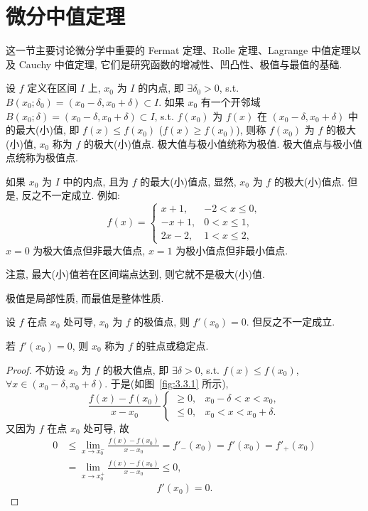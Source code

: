 \section{微分中值定理}\label{sec:3.3}

这一节主要讨论微分学中重要的 Fermat 定理、Rolle 定理、Lagrange 中值定理以及 Cauchy 中值定理, 它们是研究函数的增减性、凹凸性、极值与最值的基础.

\begin{definition}\label{def:3.3.1}
设 $f$ 定义在区间 $I$ 上, $x_0$ 为 $I$ 的内点, 即 $\exists\delta_0>0$, s.t. $B(x_0;\delta_0)=(x_0-\delta,x_0+\delta)\subset I$. 如果 $x_0$ 有一个开邻域 $B(x_0;\delta)=(x_0-\delta,x_0+\delta)\subset I$, s.t. $f(x_0)$ 为 $f(x)$ 在 $(x_0-\delta,x_0+\delta)$ 中的最大(小)值, 即 $f(x)\leqslant f(x_0)$ ($f(x)\geqslant f(x_0)$), 则称 $f(x_0)$ 为 $f$ 的极大(小)值, $x_0$ 称为 $f$ 的极大(小)值点. 极大值与极小值统称为极值. 极大值点与极小值点统称为极值点.
\end{definition}

如果 $x_0$ 为 $I$ 中的内点, 且为 $f$ 的最大(小)值点, 显然, $x_0$ 为 $f$ 的极大(小)值点. 但是, 反之不一定成立. 例如:
\[
f(x)=\begin{cases}x+1,&-2<x\leqslant0,\\ -x+1,&0<x\leqslant1,\\ 2x-2,&1<x\leqslant2,\end{cases}
\]
$x=0$ 为极大值点但非最大值点, $x=1$ 为极小值点但非最小值点.

注意, 最大(小)值若在区间端点达到, 则它就不是极大(小)值.

极值是局部性质, 而最值是整体性质.

\begin{theorem}[Fermat (1601---1665) 定理]\label{thm:3.3.1}
设 $f$ 在点 $x_0$ 处可导, $x_0$ 为 $f$ 的极值点, 则 $f'(x_0)=0$. 但反之不一定成立.
\end{theorem}

若 $f'(x_0)=0$, 则 $x_0$ 称为 $f$ 的驻点或稳定点.

\begin{proof}
不妨设 $x_0$ 为 $f$ 的极大值点, 即 $\exists\delta>0$, s.t. $f(x)\leqslant f(x_0)$, $\forall x\in(x_0-\delta,x_0+\delta)$. 于是(如图~\ref{fig:3.3.1} 所示),
\[
\frac{f(x)-f(x_0)}{x-x_0}\begin{cases}\geqslant0,&x_0-\delta<x<x_0,\\ \leqslant0,&x_0<x<x_0+\delta.\end{cases}
\]
又因为 $f$ 在点 $x_0$ 处可导, 故
\[
\begin{aligned}
0 &\leqslant\lim_{x\to x_0^-}\frac{f(x)-f(x_0)}{x-x_0}=f'_-(x_0)=f'(x_0)=f'_+(x_0)\\
&=\lim_{x\to x_0^+}\frac{f(x)-f(x_0)}{x-x_0}\leqslant0,
\end{aligned}
\]
\[
f'(x_0)=0.
\]
\end{proof}

